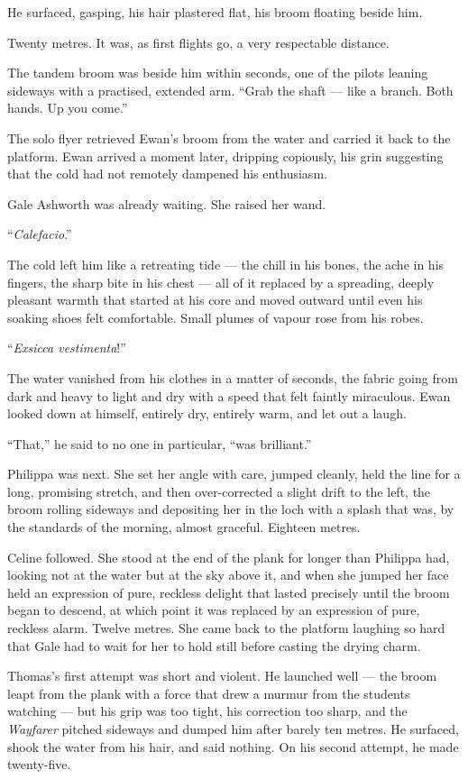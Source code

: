 He surfaced, gasping, his hair plastered flat, his broom floating beside him.
 
Twenty metres. It was, as first flights go, a very respectable distance.
 
The tandem broom was beside him within seconds, one of the pilots leaning sideways with a practised, extended arm. \enquote{Grab the shaft --- like a branch. Both hands. Up you come.}
 
The solo flyer retrieved Ewan's broom from the water and carried it back to the platform. Ewan arrived a moment later, dripping copiously, his grin suggesting that the cold had not remotely dampened his enthusiasm.
 
Gale Ashworth was already waiting. She raised her wand.
 
\enquote{\textit{Calefacio}.}
 
The cold left him like a retreating tide --- the chill in his bones, the ache in his fingers, the sharp bite in his chest --- all of it replaced by a spreading, deeply pleasant warmth that started at his core and moved outward until even his soaking shoes felt comfortable. Small plumes of vapour rose from his robes.
 
\enquote{\textit{Exsicca vestimenta}!}
 
The water vanished from his clothes in a matter of seconds, the fabric going from dark and heavy to light and dry with a speed that felt faintly miraculous. Ewan looked down at himself, entirely dry, entirely warm, and let out a laugh.
 
\enquote{That,} he said to no one in particular, \enquote{was brilliant.}
 
Philippa was next. She set her angle with care, jumped cleanly, held the line for a long, promising stretch, and then over-corrected a slight drift to the left, the broom rolling sideways and depositing her in the loch with a splash that was, by the standards of the morning, almost graceful. Eighteen metres.
 
Celine followed. She stood at the end of the plank for longer than Philippa had, looking not at the water but at the sky above it, and when she jumped her face held an expression of pure, reckless delight that lasted precisely until the broom began to descend, at which point it was replaced by an expression of pure, reckless alarm. Twelve metres. She came back to the platform laughing so hard that Gale had to wait for her to hold still before casting the drying charm.
 
Thomas's first attempt was short and violent. He launched well --- the broom leapt from the plank with a force that drew a murmur from the students watching --- but his grip was too tight, his correction too sharp, and the \textit{Wayfarer} pitched sideways and dumped him after barely ten metres. He surfaced, shook the water from his hair, and said nothing. On his second attempt, he made twenty-five.
 
